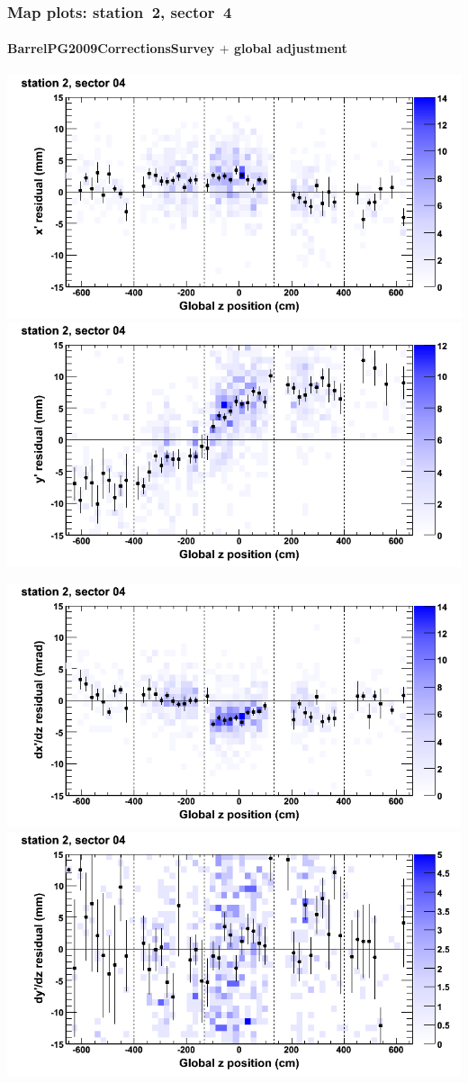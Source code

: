 \documentclass[compress]{beamer}
\begin{document}
\begin{frame}
\frametitle{Map plots: station~2, sector~4}
\framesubtitle{BarrelPG2009CorrectionsSurvey $+$ global adjustment}
\includegraphics[width=0.5\linewidth]{mapplots_re01/DTvsz_st2sec04_x.png}
\includegraphics[width=0.5\linewidth]{mapplots_re01/DTvsz_st2sec04_y.png}

\includegraphics[width=0.5\linewidth]{mapplots_re01/DTvsz_st2sec04_dxdz.png}
\includegraphics[width=0.5\linewidth]{mapplots_re01/DTvsz_st2sec04_dydz.png}
\end{frame}
\end{document}
